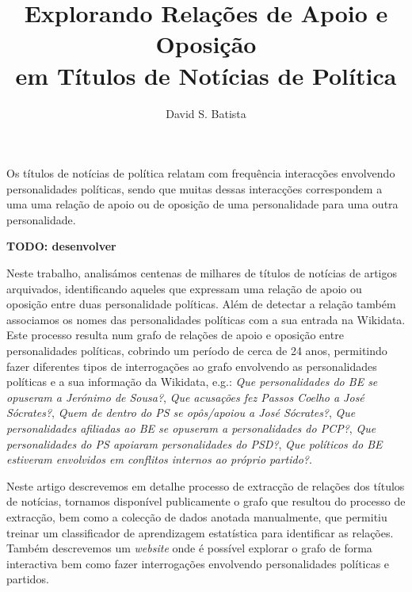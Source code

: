 \documentclass[a4paper, twocolumn, 11pt, twoside]{article}
\title{Explorando Relações de Apoio e Oposição \\em Títulos de Notícias de Política}
\author{
  David S. Batista \\
  \email{dsbatista@gmail.com} 
}
\begin{document}
\maketitle

\begin{resumo}
Os títulos de notícias de política relatam com frequência interacções envolvendo personalidades políticas, sendo que  muitas dessas interacções correspondem a uma uma relação de apoio ou de oposição de uma personalidade para uma outra personalidade.

{\bf TODO: desenvolver}

Neste trabalho, analisámos centenas de milhares de títulos de notícias de artigos arquivados, identificando aqueles que expressam uma relação de apoio ou oposição entre duas personalidade políticas. Além de detectar a relação também associamos os nomes das personalidades políticas com a sua entrada na Wikidata. Este processo resulta num grafo de relações de apoio e oposição entre personalidades políticas, cobrindo um período de cerca de 24 anos, permitindo fazer diferentes tipos de interrogações ao grafo envolvendo as personalidades políticas e a sua informação da Wikidata, e.g.: \textit{Que personalidades do BE se opuseram a Jerónimo de Sousa?}, \textit{Que acusações fez Passos Coelho a José Sócrates?}, \textit{Quem de dentro do PS se opôs/apoiou a José Sócrates?}, \textit{Que personalidades afiliadas ao BE se opuseram a personalidades do PCP?}, \textit{Que personalidades do PS apoiaram personalidades do PSD?}, \textit{Que políticos do BE estiveram envolvidos em conflitos internos ao próprio partido?}.

Neste artigo descrevemos em detalhe processo de extracção de relações dos títulos de notícias, tornamos disponível publicamente o grafo que resultou do processo de extracção, bem como a colecção de dados anotada manualmente, que permitiu treinar um classificador de aprendizagem estatística para identificar as relações. Também descrevemos um \textit{website} onde é possível explorar o grafo de forma interactiva bem como fazer interrogações envolvendo personalidades políticas e partidos.

\end{resumo}

\end{document}
